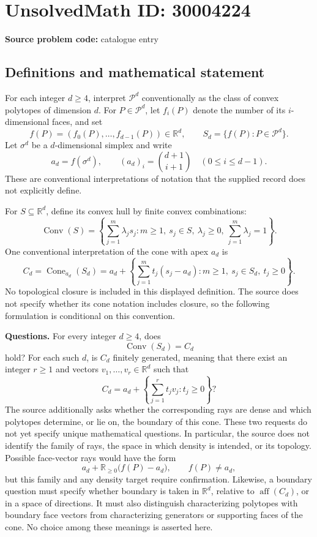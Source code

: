 \documentclass[11pt]{article}
\newcommand{\R}{\mathbb{R}}
\begin{document}
\section*{UnsolvedMath ID: 30004224}
\textbf{Source problem code:} catalogue entry
\subsection{Definitions and mathematical statement}
For each integer \(d\geq4\), interpret \(\mathcal P^d\) conventionally as the class of convex polytopes of dimension \(d\). For \(P\in\mathcal P^d\), let \(f_i(P)\) denote the number of its \(i\)-dimensional faces, and set
\[
f(P)=(f_0(P),\ldots,f_{d-1}(P))\in\R^d,
\qquad S_d=\{f(P):P\in\mathcal P^d\}.
\]
Let \(\sigma^d\) be a \(d\)-dimensional simplex and write
\[
a_d=f(\sigma^d),\qquad (a_d)_i=\binom{d+1}{i+1}\quad(0\leq i\leq d-1).
\]
These are conventional interpretations of notation that the supplied record does not explicitly define.

For \(S\subseteq\R^d\), define its convex hull by finite convex combinations:
\[
\operatorname{Conv}(S)=\left\{\sum_{j=1}^m\lambda_js_j:m\geq1,\ s_j\in S,\ \lambda_j\geq0,\ \sum_{j=1}^m\lambda_j=1\right\}.
\]
One conventional interpretation of the cone with apex \(a_d\) is
\[
C_d=\operatorname{Cone}_{a_d}(S_d)
=a_d+\left\{\sum_{j=1}^m t_j(s_j-a_d):m\geq1,\ s_j\in S_d,\ t_j\geq0\right\}.
\]
No topological closure is included in this displayed definition. The source does not specify whether its cone notation includes closure, so the following formulation is conditional on this convention.

\textbf{Questions.} For every integer \(d\geq4\), does
\[
\operatorname{Conv}(S_d)=C_d
\]
hold? For each such \(d\), is \(C_d\) finitely generated, meaning that there exist an integer \(r\geq1\) and vectors \(v_1,\ldots,v_r\in\R^d\) such that
\[
C_d=a_d+\left\{\sum_{j=1}^r t_jv_j:t_j\geq0\right\}?
\]
The source additionally asks whether the corresponding rays are dense and which polytopes determine, or lie on, the boundary of this cone. These two requests do not yet specify unique mathematical questions. In particular, the source does not identify the family of rays, the space in which density is intended, or its topology. Possible face-vector rays would have the form
\[
a_d+\R_{\geq0}\bigl(f(P)-a_d\bigr),\qquad f(P)\neq a_d,
\]
but this family and any density target require confirmation. Likewise, a boundary question must specify whether boundary is taken in \(\R^d\), relative to \(\operatorname{aff}(C_d)\), or in a space of directions. It must also distinguish characterizing polytopes with boundary face vectors from characterizing generators or supporting faces of the cone. No choice among these meanings is asserted here.
\end{document}
